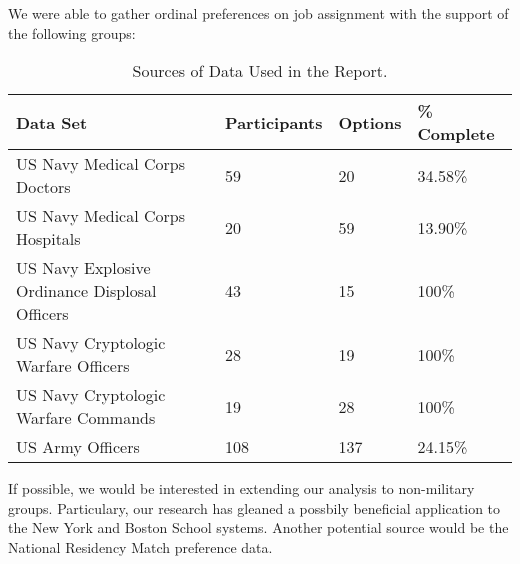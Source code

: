We were able to gather ordinal preferences on job assignment with the support of the following groups:

\begin{table}[h!]
\begin{center}
\caption{Sources of Data Used in the Report.}
\label{data_table}
\begin{tabular}{l|l|l|l}
\hline 
\textbf{Data Set} & \textbf{Participants} & \textbf{Options} & \textbf{\% Complete} \\
\hline
US Navy Medical Corps Doctors & 59  & 20 & 34.58\%\\
US Navy Medical Corps Hospitals & 20 & 59 & 13.90\%\\
US Navy Explosive Ordinance Displosal Officers & 43 & 15 & 100\%\\
US Navy Cryptologic Warfare Officers & 28 & 19 & 100\%\\
US Navy Cryptologic Warfare Commands & 19 & 28 & 100\%\\
US Army Officers & 108 & 137 & 24.15\%\\
\hline 
\end{tabular}
\end{center}
\end{table}

If possible, we would be interested in extending our analysis to non-military groups. Particulary, our research has gleaned a possbily beneficial application to the New York and Boston School systems. Another potential source would be the National Residency Match preference data.

